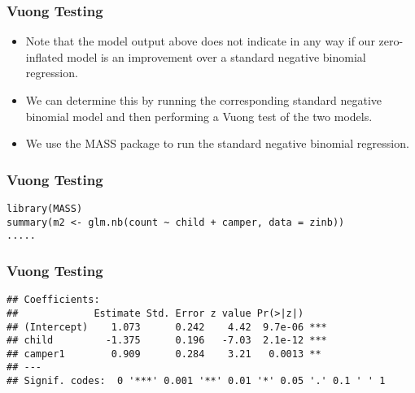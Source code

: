 \documentclass[MASTER.tex]{subfiles}
\begin{document}
 
\begin{frame}
\frametitle{Vuong Testing}
	\begin{itemize}
\item Note that the model output above does not indicate in any way if our zero-inflated model is an improvement over a standard negative binomial regression. 
\item We can determine this by running the corresponding standard negative binomial model and then performing a Vuong test of the two models.
\item We use the MASS package to run the standard negative binomial regression.
	\end{itemize}


\end{frame}
\begin{frame}[fragile]
	\frametitle{Vuong Testing}
\begin{verbatim}
library(MASS)
summary(m2 <- glm.nb(count ~ child + camper, data = zinb))
.....
\end{verbatim}
\end{frame}
\begin{frame}[fragile]
	\frametitle{Vuong Testing}
\begin{verbatim}
## Coefficients:
##             Estimate Std. Error z value Pr(>|z|)    
## (Intercept)    1.073      0.242    4.42  9.7e-06 ***
## child         -1.375      0.196   -7.03  2.1e-12 ***
## camper1        0.909      0.284    3.21   0.0013 ** 
## ---
## Signif. codes:  0 '***' 0.001 '**' 0.01 '*' 0.05 '.' 0.1 ' ' 1
\end{verbatim}
\end{frame}
\end{document}

